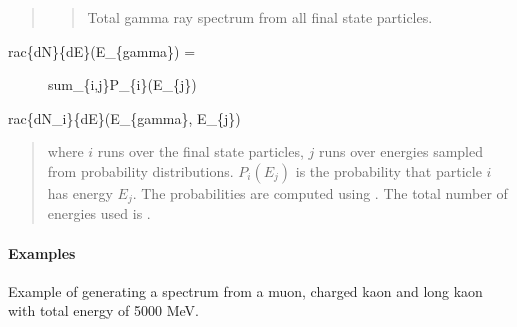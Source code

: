 \documentclass[letterpaper,10pt,english]{sphinxmanual}
\begin{document}
\begin{fulllineitems}
\begin{quote}
\begin{description}
\begin{quote}
Total gamma ray spectrum from all final state particles.
\end{quote}

\end{description}\end{quote}
\begin{description}
\item[{rac\{dN\}\{dE\}(E\_\{gamma\}) =}] \leavevmode
sum\_\{i,j\}P\_\{i\}(E\_\{j\})

\end{description}

rac\{dN\_i\}\{dE\}(E\_\{gamma\}, E\_\{j\})
\begin{quote}

where \(i\) runs over the final state particles, \(j\) runs over
energies sampled from probability distributions. \(P_{i}(E_{j})\) is
the probability that particle \(i\) has energy \(E_{j}\). The
probabilities are computed using . The
total number of energies used is .
\end{quote}
\paragraph{Examples}

Example of generating a spectrum from a muon, charged kaon and long kaon
with total energy of 5000 MeV.

\begin{sphinxVerbatim}[commandchars=\\\{\}]
   
   
  \PYG{p}{[}  \PYG{p}{]}
  
     
    
\end{sphinxVerbatim}

\end{fulllineitems}
\end{document}
